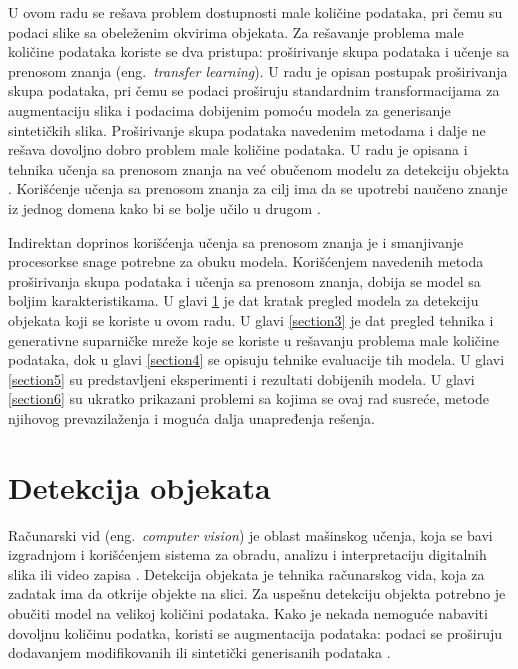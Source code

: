 \documentclass[12pt,oneside]{memoir}
\begin{document}
U ovom radu se rešava problem dostupnosti male količine podataka, pri čemu su podaci slike sa obeleženim okvirima objekata. Za rešavanje problema male količine podataka koriste se dva pristupa: proširivanje skupa podataka i učenje sa prenosom znanja (eng.~\textit{transfer learning}).
U radu je opisan postupak proširivanja skupa podataka, pri čemu se podaci proširuju standardnim transformacijama za augmentaciju slika i podacima dobijenim pomoću modela za generisanje sintetičkih slika.
Proširivanje skupa podataka navedenim metodama i dalje ne rešava dovoljno dobro problem male količine podataka. 
U radu je opisana i tehnika učenja sa prenosom znanja \cite{zhuang2020comprehensive} na već obučenom modelu za detekciju objekta \cite{bochkovskiy2020yolov4}. 
Korišćenje učenja sa prenosom znanja za cilj ima da se upotrebi naučeno znanje iz jednog domena kako bi se bolje učilo u drugom \cite{brigato2021close, bengio2012deep}.

Indirektan doprinos korišćenja učenja sa prenosom znanja je i smanjivanje procesorkse snage potrebne za obuku modela.
Korišćenjem navedenih metoda proširivanja skupa podataka i učenja sa prenosom znanja, dobija se model sa boljim karakteristikama.
U glavi \ref{section2} je dat kratak pregled modela za detekciju objekata koji se koriste u ovom radu. U glavi \ref{section3} je dat pregled tehnika i generativne suparničke mreže koje se koriste u rešavanju problema male količine podataka, dok u glavi \ref{section4} se opisuju tehnike evaluacije tih modela. U glavi \ref{section5} su predstavljeni eksperimenti i rezultati dobijenih modela. U glavi \ref{section6} su ukratko prikazani problemi sa kojima se ovaj rad susreće, metode njihovog prevazilaženja i moguća dalja unapređenja rešenja.


\chapter{Detekcija objekata}
\label{section2}
Računarski vid (eng.~\textit{computer vision}) je oblast mašinskog učenja, koja se bavi izgradnjom i korišćenjem  sistema za obradu, analizu i interpretaciju digitalnih slika ili video zapisa \cite{ballard1982computer, huang1996computer}.
Detekcija objekata je tehnika računarskog vida, koja za zadatak ima 
da otkrije objekte na slici. Za uspešnu detekciju objekta potrebno je obučiti model na velikoj količini podataka. 
Kako je nekada nemoguće nabaviti dovoljnu količinu podatka, koristi se augmentacija podataka: podaci se proširuju dodavanjem modifikovanih ili sintetički generisanih podataka \cite{shorten2019survey}. 
\end{document}
